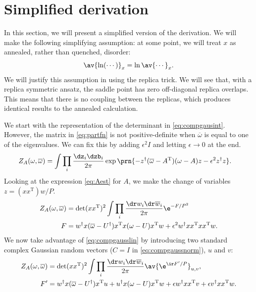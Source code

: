 \documentclass[12pt]{article}
\newcommand{\inv}{^{-1}}
\newcommand{\dg}{^\dagger}
\newcommand{\trans}{^\mathrm{T}}
\newcommand{\omb}{\overline{\omega}}
\newcommand{\dw}{\dr w}
\newcommand{\dwb}{\dr\overline{w}}
\begin{document}
\section{Simplified derivation}\label{sec:simplederiv}

In this section, we will present a simplified version of the derivation.
We will make the following simplifying assumption: at some point, we will treat $x$ as annealed, rather than quenched, disorder:
%
\begin{equation}\label{eq:annealed}
  \av{\ln (\cdots)}_x = \ln\av{\cdots}_x.
\end{equation}
%
We will justify this assumption in  using the replica trick.
We will see that, with a replica symmetric ansatz, the saddle point has zero off-diagonal replica overlaps.
This means that there is no coupling between the replicas, which produces identical results to the annealed calculation.

We start with the representation of the determinant in \eqref{eq:compgausint}.
However, the matrix in \eqref{eq:partfn} is not positive-definite when $\omb$ is equal to one of the eigenvalues.
We can fix this by adding $\epsilon^2I$ and letting $\epsilon\to0$ at the end.
%
\begin{equation}\label{eq:partfnintz}
\begin{aligned}
  Z_A(\omega,\omb) &= \int \prod_i\frac{\dz_i\dzb_i}{2\pi} \exp\prn{
    -z\dg (\omb-A\trans)(\omega-A) z - \epsilon^2 z\dg z} .%
\end{aligned}
\end{equation}
%
Looking at the expression \eqref{eq:Aest} for $A$, we make the change of variables $z=(xx\trans)w/P$.
%
\begin{equation}\label{eq:partfnintw}
\begin{aligned}
  Z_A(\omega,\omb) &= \det(xx\trans)^2 \int \prod_i\frac{\dw_i\dwb_i}{2\pi}\e^{-F/P^2}
    \\
  F &=
     w\dg x(\omb-U\dg)x\trans x(\omega-U)x\trans w + \epsilon^2 w\dg xx\trans xx\trans w .%
\end{aligned}
\end{equation}
%
We now take advantage of \eqref{eq:compgausslin} by introducing two standard complex Gaussian random vectors ($C=I$ in \eqref{eq:compgaussnorm}), $u$ and $v$:
%
\begin{equation}\label{eq:partfnintwuv}
\begin{aligned}
  Z_A(\omega,\omb) &= \det(xx\trans)^2 \int \prod_i\frac{\dw_i\dwb_i}{2\pi} \av{\e^{\ir F'/P}}_{u,v},\\
  F' &=
    w\dg x(\omb-U\dg)x\trans u + u\dg x(\omega-U)x\trans w + \epsilon w\dg xx\trans v + \epsilon v\dg xx\trans w .%
\end{aligned}
\end{equation}
%
\end{document}
